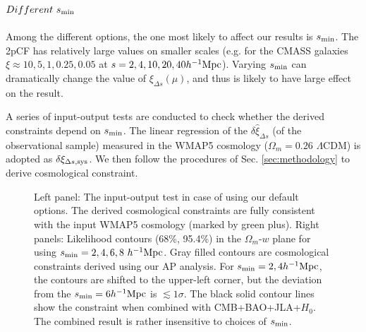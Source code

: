 \documentclass[iop]{emulateapj}
\begin{document}
\subsection{$Different\ s_{\rm min}$}


Among the different options, %
the one most likely to affect our results is $s_{\rm min}$.
The 2pCF has relatively large values on smaller scales
(e.g. for the CMASS galaxies $\xi\approx10,5,1,0.25,0.05$ at $s=2,4,10,20,40 h^{-1}{\rm Mpc}$).
Varying $s_{\rm min}$ can dramatically change the value of $\xi_{\Delta s}(\mu)$,
and thus is likely to have large effect on the result.

A series of input-output tests are conducted to check whether the derived constraints depend on $s_{\rm min}$.
The linear regression of the $\delta\hat\xi_{\Delta s}$ (of the observational sample) 
measured in the WMAP5 cosmology ($\Omega_m=0.26$ $\Lambda$CDM) 
is adopted as $\delta\xi_{\Delta s, \rm sys}$. 
We then follow the procedures of Sec. \ref{sec:methodology} to derive cosmological constraint.

\begin{figure}
   \centering{
   \texttt{[image: fig13\_0.eps]}
   \texttt{[image: fig13\_1.eps]}}
   \caption{ \label{fig_contour_diffsmin} 
   Left panel: The input-output test in case of using our default options.
   The derived cosmological constraints are fully consistent with the input WMAP5 cosmology (marked by green plus).
   Right panels: Likelihood contours (68\%, 95.4\%) in the $\Omega_m$-$w$ plane for using $s_{\rm min}=2,4,6,8\ h^{-1} {\rm Mpc}$.
   Gray filled contours are cosmological constraints derived using our AP analysis.
   For $s_{\rm min}=2,4h^{-1}{\rm Mpc}$, the contours are shifted to the upper-left corner, 
   but the deviation from the $s_{\rm min}=6h^{-1}{\rm Mpc}$ is $\lesssim1\sigma$.
   The black solid contour lines show the constraint when combined with CMB+BAO+JLA+$H_0$.
   The combined result is rather insensitive to choices of $s_{\rm min}$.}
\end{figure}
\end{document}
